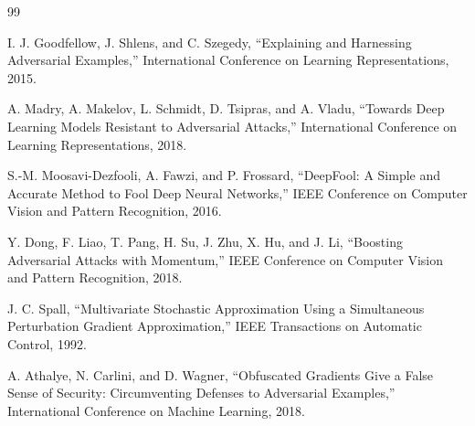 \documentclass[UTF8,a4paper,12pt]{ctexart}
\begin{document}
\begin{table}[H]
    \centering
    \caption{不足与改进方向}
    \label{tab:limitations}
\end{table}

\begin{thebibliography}{99}

I. J. Goodfellow, J. Shlens, and C. Szegedy,
``Explaining and Harnessing Adversarial Examples,''
International Conference on Learning Representations, 2015.

A. Madry, A. Makelov, L. Schmidt, D. Tsipras, and A. Vladu,
``Towards Deep Learning Models Resistant to Adversarial Attacks,''
International Conference on Learning Representations, 2018.

S.-M. Moosavi-Dezfooli, A. Fawzi, and P. Frossard,
``DeepFool: A Simple and Accurate Method to Fool Deep Neural Networks,''
IEEE Conference on Computer Vision and Pattern Recognition, 2016.

Y. Dong, F. Liao, T. Pang, H. Su, J. Zhu, X. Hu, and J. Li,
``Boosting Adversarial Attacks with Momentum,''
IEEE Conference on Computer Vision and Pattern Recognition, 2018.

J. C. Spall,
``Multivariate Stochastic Approximation Using a Simultaneous Perturbation Gradient Approximation,''
IEEE Transactions on Automatic Control, 1992.

A. Athalye, N. Carlini, and D. Wagner,
``Obfuscated Gradients Give a False Sense of Security: Circumventing Defenses to Adversarial Examples,''
International Conference on Machine Learning, 2018.

\end{thebibliography}
\end{document}
